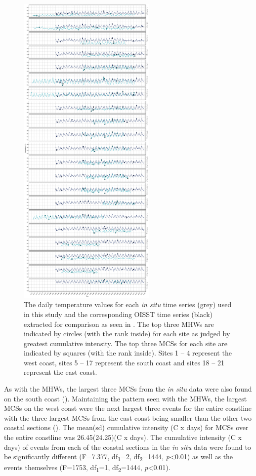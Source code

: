 \documentclass[a4paper,10pt,review]{elsarticle}
\begin{document}
\begin{figure}
\centering \includegraphics[width=0.6\textwidth]{figure2.pdf}
\caption{The daily temperature values for each \emph{in situ} time series (grey) used in this study and the corresponding OISST time series (black) extracted for comparison as seen in . The top three MHWs are indicated by circles (with the rank inside) for each site as judged by greatest cumulative intensity. The top three MCSs for each site are indicated by squares (with the rank inside). Sites 1 -- 4 represent the west coast, sites 5 -- 17 represent the south coast and sites 18 -- 21 represent the east coast.} \label{fig:Figure2}
\end{figure}

As with the MHWs, the largest three MCSs from the \emph{in situ} data were also found on the south coast (). Maintaining the pattern seen with the MHWs, the largest MCSs on the west coast were the next largest three events for the entire coastline with the three largest MCSs from the east coast being smaller than the other two coastal sections (). The mean(sd) cumulative intensity (\degree C x days) for MCSs over the entire coastline was 26.45(24.25)(\degree C x days). The cumulative intensity (\degree C x days) of events from each of the coastal sections in the \emph{in situ} data were found to be significantly different (F=7.377, df\textsubscript{1}=2, df\textsubscript{2}=1444, \emph{p}<0.01) as well as the events themselves (F=1753, df\textsubscript{1}=1, df\textsubscript{2}=1444, \emph{p}<0.01).
\end{document}
